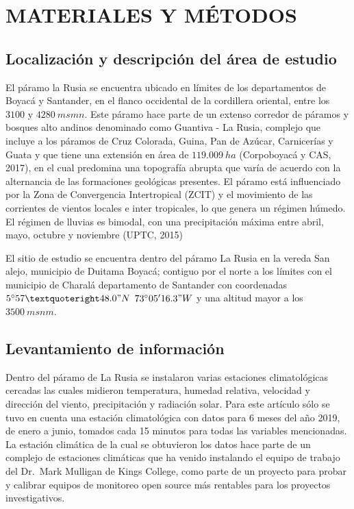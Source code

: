 \documentclass[conference,final,]{IEEEtran}
\begin{document}
\hypertarget{materiales-y-muxe9todos}{%
\section{MATERIALES Y MÉTODOS}\label{materiales-y-muxe9todos}}

\hypertarget{localizaciuxf3n-y-descripciuxf3n-del-uxe1rea-de-estudio}{%
\subsection{Localización y descripción del área de
estudio}\label{localizaciuxf3n-y-descripciuxf3n-del-uxe1rea-de-estudio}}

El páramo la Rusia se encuentra ubicado en límites de los departamentos
de Boyacá y Santander, en el flanco occidental de la cordillera
oriental, entre los \(3100\) y \(4280 \ msmn\). Este páramo hace parte
de un extenso corredor de páramos y bosques alto andinos denominado como
Guantiva - La Rusia, complejo que incluye a los páramos de Cruz
Colorada, Guina, Pan de Azúcar, Carnicerías y Guata y que tiene una
extensión en área de \(119.009 \ ha\) (Corpoboyacá y CAS, 2017), en el
cual predomina una topografía abrupta que varía de acuerdo con la
alternancia de las formaciones geológicas presentes. El páramo está
influenciado por la Zona de Convergencia Intertropical (ZCIT) y el
movimiento de las corrientes de vientos locales e inter tropicales, lo
que genera un régimen húmedo. El régimen de lluvias es bimodal, con una
precipitación máxima entre abril, mayo, octubre y noviembre (UPTC, 2015)

El sitio de estudio se encuentra dentro del páramo La Rusia en la vereda
San alejo, municipio de Duitama Boyacá; contiguo por el norte a los
límites con el municipio de Charalá departamento de Santander con
coordenadas \(5^{\circ}57’48.0"N\) \(73^{\circ}05'16.3"W\) y una altitud
mayor a los \(3500\ msnm\).

\hypertarget{levantamiento-de-informaciuxf3n}{%
\subsection{Levantamiento de
información}\label{levantamiento-de-informaciuxf3n}}

Dentro del páramo de La Rusia se instalaron varias estaciones
climatológicas cercadas las cuales midieron temperatura, humedad
relativa, velocidad y dirección del viento, precipitación y radiación
solar. Para este artículo sólo se tuvo en cuenta una estación
climatológica con datos para 6 meses del año 2019, de enero a junio,
tomados cada 15 minutos para todas las variables mencionadas. La
estación climática de la cual se obtuvieron los datos hace parte de un
complejo de estaciones climáticas que ha venido instalando el equipo de
trabajo del Dr.~Mark Mulligan de Kings College, como parte de un
proyecto para probar y calibrar equipos de monitoreo open source más
rentables para los proyectos investigativos.
\end{document}
